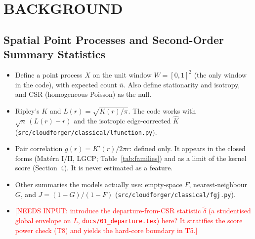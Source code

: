 \documentclass[twoside]{article}
\newcommand{\TBD}[1]{\textcolor{red}{[TBD\ifx\relax#1\relax\else: #1\fi]}}
\newcommand{\NI}[1]{\textcolor{red}{[NEEDS INPUT: #1]}}
\newcommand{\src}[1]{{\footnotesize\texttt{#1}}}
\newcommand{\nb}{\bar n}
\begin{document}

\begin{abstract}
\TBD{abstract; write last. A pre-skeleton draft exists in \src{docs/aistats\_outline.tex} and will need
re-aligning with the section structure below.}
\end{abstract}

\section{BACKGROUND}

\subsection{Spatial Point Processes and Second-Order Summary Statistics}
\begin{itemize}
  \item Define a point process $X$ on the unit window $W=[0,1]^2$ (the only window in the code), with expected
        count $\nb$. Also define stationarity and isotropy, and CSR (homogeneous Poisson) as the null.
  \item Ripley's $K$ and $L(r)=\sqrt{K(r)/\pi}$. The code works with $\sqrt n\,(L(r)-r)$ and the isotropic
        edge-corrected $\hat K$ (\src{src/cloudforger/classical/lfunction.py}).
  \item Pair correlation $g(r)=K'(r)/2\pi r$: defined only. It appears in the closed forms (Mat\'ern I/II, LGCP;
        Table~\ref{tab:families}) and as a limit of the kernel score (Section~4). It is never estimated as a feature.
  \item Other summaries the models actually use: empty-space $F$, nearest-neighbour $G$, and $J=(1-G)/(1-F)$
        (\src{src/cloudforger/classical/fgj.py}).
  \item \NI{introduce the departure-from-CSR statistic $\tilde\delta$ (a studentised global envelope on $L$,
        \src{docs/01\_departure.tex}) here? It stratifies the score power check (T8) and yields the hard-core
        boundary in T5.}
\end{itemize}
\end{document}
